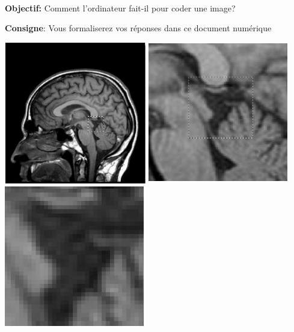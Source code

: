 \documentclass{article}
\begin{document}
\begin{center}
	\begin{flushright}
		\begin{Form}
			\\
			\\
			\\
		\end{Form}
	\end{flushright}

	\vspace{1em}
	\Large
	\textbf{Objectif:} Comment l'ordinateur fait-il pour coder une image?

	\vspace{2em}
	\large
	\textbf{Consigne}: Vous formaliserez vos réponses dans ce document numérique

	\vspace{2em}
	\includegraphics[width=.3\linewidth]{./figures/irm1.png}
	\includegraphics[width=.3\linewidth]{./figures/irm2.png}
	\includegraphics[width=.3\linewidth]{./figures/irm3.png}
\end{center}
\end{document}
